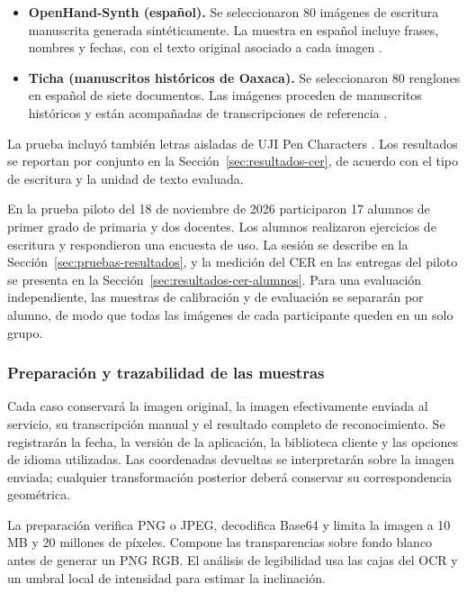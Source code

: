 \begin{itemize}
    \item \textbf{OpenHand-Synth (español).} Se seleccionaron 80 imágenes de escritura manuscrita generada sintéticamente. La muestra en español incluye frases, nombres y fechas, con el texto original asociado a cada imagen \cite{openhandSynthDataset}.
    \item \textbf{Ticha (manuscritos históricos de Oaxaca).} Se seleccionaron 80 renglones en español de siete documentos. Las imágenes proceden de manuscritos históricos y están acompañadas de transcripciones de referencia \cite{tichaManuscriptLines}.
\end{itemize}

La prueba incluyó también letras aisladas de UJI Pen Characters \cite{ujiPenCharactersV2}. Los resultados se reportan por conjunto en la Sección~\ref{sec:resultados-cer}, de acuerdo con el tipo de escritura y la unidad de texto evaluada.

En la prueba piloto del 18 de noviembre de 2026 participaron 17 alumnos de primer grado de primaria y dos docentes. Los alumnos realizaron ejercicios de escritura y respondieron una encuesta de uso. La sesión se describe en la Sección~\ref{sec:pruebas-resultados}, y la medición del CER en las entregas del piloto se presenta en la Sección~\ref{sec:resultados-cer-alumnos}. Para una evaluación independiente, las muestras de calibración y de evaluación se separarán por alumno, de modo que todas las imágenes de cada participante queden en un solo grupo.

\subsubsection{Preparación y trazabilidad de las muestras}
Cada caso conservará la imagen original, la imagen efectivamente enviada al servicio, su transcripción manual y el resultado completo de reconocimiento. Se registrarán la fecha, la versión de la aplicación, la biblioteca cliente y las opciones de idioma utilizadas. Las coordenadas devueltas se interpretarán sobre la imagen enviada; cualquier transformación posterior deberá conservar su correspondencia geométrica.

La preparación verifica PNG o JPEG, decodifica Base64 y limita la imagen a 10 MB y 20 millones de píxeles. Compone las transparencias sobre fondo blanco antes de generar un PNG RGB. El análisis de legibilidad usa las cajas del OCR y un umbral local de intensidad para estimar la inclinación.

